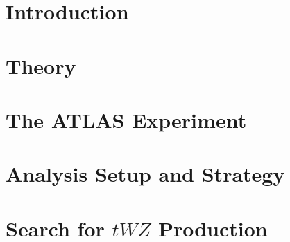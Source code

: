 \documentclass[]{article}
\begin{document}
\section{Introduction}
\section{Theory}
\section{The ATLAS Experiment}
\section{Analysis Setup and Strategy}
\section{Search for $tWZ$ Production}
\end{document}

